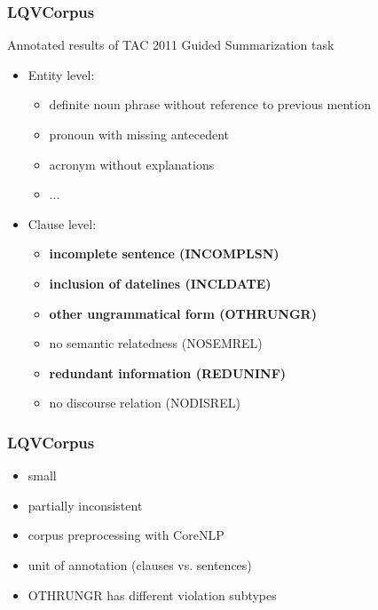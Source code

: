 \documentclass[table]{beamer}
\begin{document}
\begin{frame}
  \frametitle{LQVCorpus \citep{friedrichlqvsumm}}
  Annotated results of TAC 2011 Guided Summarization task \citep{owczarzak2011overview}
\pause
  \begin{itemize}
    \item Entity level:
    \begin{itemize}
      \item definite noun phrase without reference to previous mention%
      \item pronoun with missing antecedent%
      \item acronym without explanations%
      \item ...
    \end{itemize}\pause
    \item Clause level:
    \begin{itemize}
      \item \textbf{incomplete sentence (INCOMPLSN)}
      \item \textbf{inclusion of datelines (INCLDATE)}
      \item \textbf{other ungrammatical form (OTHRUNGR)}
      \item no semantic relatedness (NOSEMREL)
      \item \textbf{redundant information (REDUNINF)}
      \item no discourse relation (NODISREL)
    \end{itemize}
  \end{itemize}
\end{frame}

\begin{frame}
  \frametitle{LQVCorpus \citep{friedrichlqvsumm}}
  \begin{itemize}
    \item small %
    \item partially inconsistent\pause %
    \item corpus preprocessing with CoreNLP \citep{manning-EtAl:2014:P14-5}
    \item unit of annotation (clauses vs. sentences)\pause
    \item OTHRUNGR has different violation subtypes%
  \end{itemize}
\end{frame}
\end{document}
